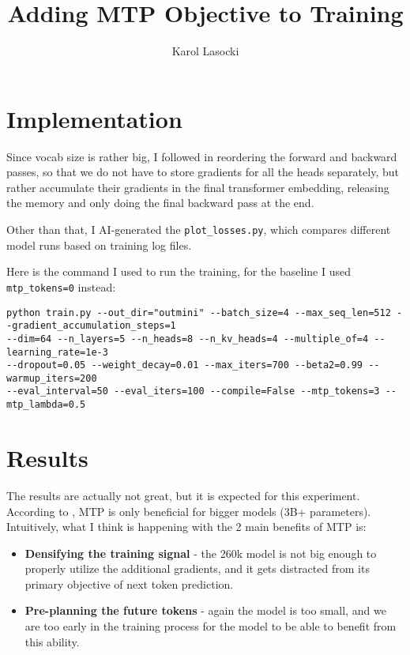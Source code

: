 \documentclass[10pt]{article}
\title{\vspace{-1.5cm}Adding MTP Objective to Training}
\author{Karol Lasocki}
\date{\vspace{-1.5cm}}
\begin{document}
\maketitle

\setlength{\abovedisplayskip}{3pt}
\setlength{\belowdisplayskip}{3pt}
\setlength{\abovedisplayshortskip}{1pt}
\setlength{\belowdisplayshortskip}{1pt}
\setlength{\itemsep}{0pt}
\setlength{\parsep}{0pt}
\setlength{\topsep}{1pt}

\section{Implementation}


Since vocab size is rather big, I followed \citet{gloeckle2024} in reordering the forward and backward passes, so that we do not have to store gradients for all the heads separately, but rather accumulate their gradients in the final transformer embedding, releasing the memory and only doing the final backward pass at the end.

Other than that, I AI-generated the \texttt{plot\_losses.py}, which compares different model runs based on training log files.

Here is the command I used to run the training, for the baseline I used \texttt{mtp\_tokens=0} instead:
{\small
\begin{verbatim}
python train.py --out_dir="outmini" --batch_size=4 --max_seq_len=512 --gradient_accumulation_steps=1
--dim=64 --n_layers=5 --n_heads=8 --n_kv_heads=4 --multiple_of=4 --learning_rate=1e-3
--dropout=0.05 --weight_decay=0.01 --max_iters=700 --beta2=0.99 --warmup_iters=200
--eval_interval=50 --eval_iters=100 --compile=False --mtp_tokens=3 --mtp_lambda=0.5
\end{verbatim}
}

\section{Results}

The results are actually not great, but it is expected for this experiment. According to \citet{gloeckle2024}, MTP is only beneficial for bigger models (3B+ parameters). Intuitively, what I think is happening with the 2 main benefits of MTP is:
\begin{itemize}[leftmargin=*,itemsep=0pt,topsep=0pt,parsep=0pt]
    \item \textbf{Densifying the training signal} - the 260k model is not big enough to properly utilize the additional gradients, and it gets distracted from its primary objective of next token prediction.
    \item \textbf{Pre-planning the future tokens} - again the model is too small, and we are too early in the training process for the model to be able to benefit from this ability.
\end{itemize}
\end{document}
